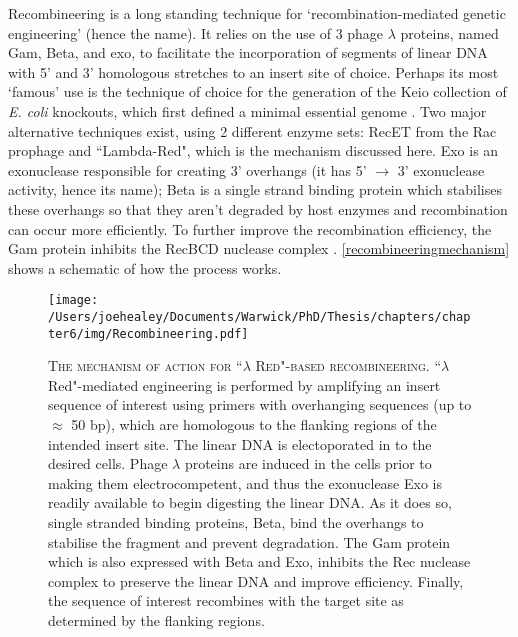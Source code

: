 Recombineering is a long standing technique for `recombination-mediated genetic engineering' (hence the name). It relies on the use of 3 phage $\lambda$ proteins, named Gam, Beta, and exo, to facilitate the incorporation of segments of linear DNA with 5' and 3' homologous stretches to an insert site of choice. Perhaps its most `famous' use is the technique of choice for the generation of the Keio collection of \emph{E. coli} knockouts, which first defined a minimal essential genome \citep{Baba2006}. Two major alternative techniques exist, using 2 different enzyme sets: RecET from the Rac prophage and ``Lambda-Red", which is the mechanism discussed here. Exo is an exonuclease responsible for creating 3' overhangs (it has 5' $\rightarrow$ 3' exonuclease activity, hence its name); Beta is a single strand binding protein which stabilises these overhangs so that they aren't degraded by host enzymes and recombination can occur more efficiently. To further improve the recombination efficiency, the Gam protein inhibits the RecBCD nuclease complex \citep{Yu2000}. \vref{recombineeringmechanism} shows a schematic of how the process works.


\begin{figure}[p]
    \texttt{[image: /Users/joehealey/Documents/Warwick/PhD/Thesis/chapters/chapter6/img/Recombineering.pdf]}
    \captionsetup{singlelinecheck=off, justification=justified, font=footnotesize, aboveskip=10pt}
    \caption[Recombineering mechanism of action]{\textsc{\normalsize The mechanism of action for ``$\lambda$ Red"-based recombineering.} \vspace{0.1cm} \newline ``$\lambda$ Red"-mediated engineering is performed by amplifying an insert sequence of interest using primers with overhanging sequences (up to $\approx$ 50 bp), which are homologous to the flanking regions of the intended insert site. The linear DNA is electoporated in to the desired cells. Phage $\lambda$ proteins are induced in the cells prior to making them electrocompetent, and thus the exonuclease Exo is readily available to begin digesting the linear DNA. As it does so, single stranded binding proteins, Beta, bind the overhangs to stabilise the fragment and prevent degradation. The Gam protein which is also expressed with Beta and Exo, inhibits the Rec nuclease complex to preserve the linear DNA and improve efficiency. Finally, the sequence of interest recombines with the target site as determined by the flanking regions.}
\label{recombineeringmechanism}
\end{figure}


